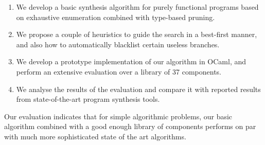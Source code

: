 \begin{enumerate}
\item We develop a basic synthesis algorithm for purely functional programs based on exhaustive enumeration combined with type-based pruning.

\item We propose a couple of heuristics to guide the search in a best-first manner, and also how to automatically blacklist certain useless branches.

\item We develop a prototype implementation of our algorithm in OCaml, and perform an extensive evaluation over a library of 37 components.

\item We analyse the results of the evaluation and compare it with reported results from state-of-the-art program synthesis tools.
\end{enumerate}  

Our evaluation indicates that for simple algorithmic problems, our basic algorithm combined with a good enough library of components performs on par with much more sophisticated state of the art algorithms.
